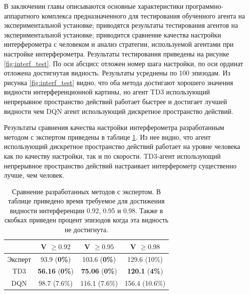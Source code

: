 В заключении главы описываются основные характеристики программно-аппаратного комплекса предназначенного для тестирования обученного агента на экспериментальной установке; приводятся результаты тестирования агентов на экспериментальной установке; приводится сравнение качества настройки интерферометра с человеком и анализ стратегии, используемой агентами при настройке интерферометра. Результаты тестирования приведены на рисунке \ref{fig:interf_test}. По оси абсцисс отложен номер шага настройки, по оси ординат отложена достигнутая видность. Результаты усреднены по 100 эпизодам. Из рисунка \ref{fig:interf_test} видно, что оба метода достигают хорошего значения видности интерференционной картины, но агент TD3 использующий непрерывное пространство действий работает быстрее и достигает лучшей видности чем DQN агент использующий дискретное пространство действий. 

Результаты сравнения качества настройки интерферометра разработанным методом с экспертом приведены в таблице \ref{tab:human}. Из нее видно, что агент использующий дискретное пространство действий работает на уровне человека как по качеству настройки, так и по скорости. TD3-агент использующий непрерывное пространство действий настраивает интерферометр существенно лучше, чем человек. 

\begin{table} [htbp]
    \centering
    \begin{threeparttable}%
        \caption{Сравнение разработанных методов с экспертом. В таблице приведено время требуемое для достижения видности интерференции 0.92, 0.95 и 0.98. Также в скобках приведен процент эпизодов когда эта видность не достигнута.}
        \begin{tabular}{|c|c|c|c|}
            \hline
            \hline
             &V $\ge 0.92$ & V $\ge 0.95$ & V $\ge 0.98$\\\midrule 
            \hline
            Эксперт &  93.9 (\textbf{0\%})  & 103.6 (\textbf{0\%}) & 129.6 (10\%)\\
            \hline
            TD3 &  \textbf{56.16} (\textbf{0\%}) & \textbf{75.06} (\textbf{0\%}) & \textbf{120.1} (\textbf{4\%})\\
            \hline
            DQN &  98.7 (7.6\%) & 116.1 (7.6\%) & 156.4 (10.6\%)\\
            \hline
            \hline
        \end{tabular}
        \label{tab:human}
    \end{threeparttable}
\end{table}

